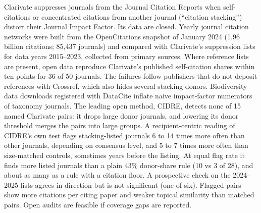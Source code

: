 Clarivate suppresses journals from the Journal Citation Reports when self-citations or concentrated citations from
another journal (``citation stacking'') distort their Journal Impact Factor. Its data are closed. Yearly
journal citation networks were built from the OpenCitations snapshot of January 2024 (1.96 billion citations; 85,437 journals)
and compared with Clarivate's suppression lists for data years 2015--2023, collected from primary sources. Where
reference lists are present, open data reproduce Clarivate's published self-citation shares within ten
points for 36 of 50 journals. The failures follow publishers that do not deposit references with Crossref, which also
hides several stacking donors. Biodiversity data downloads registered with DataCite inflate naive impact-factor
numerators of taxonomy journals. The leading open method, CIDRE, detects none of 15 named
Clarivate pairs: it drops large donor journals, and lowering its donor threshold merges the pairs into large groups. A recipient-centric reading of CIDRE's own test flags stacking-listed journals 6 to 14 times more often than
other journals, depending on consensus level, and 5 to 7 times more often than size-matched controls, sometimes years
before the listing. At equal flag rate it finds more listed journals than a plain 43\% donor-share rule (10 vs 3 of
28), and about as many as a rule with a citation floor. A prospective check on the 2024--2025 lists agrees in
direction but is not significant (one of six). Flagged pairs show more citations per citing paper and weaker topical
similarity than matched pairs. Open audits are feasible if coverage gaps are reported.
